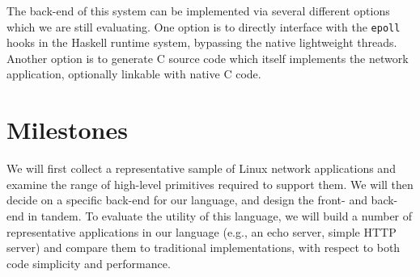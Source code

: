 \documentclass{article}
\renewcommand{\t}{\texttt}
\begin{document}
The back-end of this system can be implemented via several different options
which we are still evaluating. One option is to directly interface with the
\t{epoll} hooks in the Haskell runtime system, bypassing the native lightweight
threads. Another option is to generate C source code which itself implements the
network application, optionally linkable with native C code.

\section{Milestones}

We will first collect a representative sample of Linux network applications and
examine the range of high-level primitives required to support them. We will
then decide on a specific back-end for our language, and design the front- and
back-end in tandem. To evaluate the utility of this language, we will build a
number of representative applications in our language (e.g., an echo server,
simple HTTP server) and compare them to traditional implementations, with
respect to both code simplicity and performance.

{}

\end{document}
